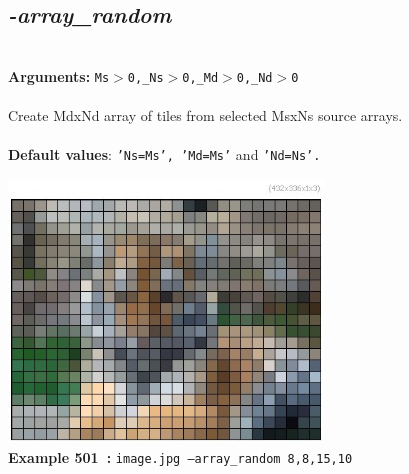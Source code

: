 \documentclass[a4paper,11pt,twoside]{book}
\begin{document}
\subsection{\emph{-array\_random} }\vspace*{-0.5em}
~\\\textbf{Arguments: } 
{\small \texttt{Ms$>$0,\_Ns$>$0,\_Md$>$0,\_Nd$>$0}}\\~\\
Create MdxNd array of tiles from selected MsxNs source arrays.
~\\~\\\textbf{Default values}: {\small \texttt{'Ns=Ms', 'Md=Ms'} and \texttt{'Nd=Ns'.}}
\begin{center}\includegraphics[keepaspectratio=true,height=7cm,width=\textwidth]{img/gmic_def501.jpg}\\
{\footnotesize \textbf{Example 501~:} \texttt{image.jpg --array\_random 8,8,15,10}}
\end{center}
\end{document}
